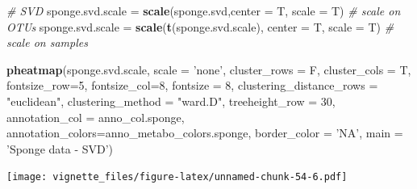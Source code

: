 \documentclass[]{book}
\newenvironment{Shaded}{\begin{snugshade}}{\end{snugshade}}
\newcommand{\KeywordTok}[1]{\textcolor[rgb]{0.13,0.29,0.53}{\textbf{#1}}}
\newcommand{\DataTypeTok}[1]{\textcolor[rgb]{0.13,0.29,0.53}{#1}}
\newcommand{\DecValTok}[1]{\textcolor[rgb]{0.00,0.00,0.81}{#1}}
\newcommand{\StringTok}[1]{\textcolor[rgb]{0.31,0.60,0.02}{#1}}
\newcommand{\CommentTok}[1]{\textcolor[rgb]{0.56,0.35,0.01}{\textit{#1}}}
\newcommand{\NormalTok}[1]{#1}
\begin{document}
\begin{Shaded}
\begin{Highlighting}[]
\CommentTok{# SVD}
\NormalTok{sponge.svd.scale =}\StringTok{ }\KeywordTok{scale}\NormalTok{(sponge.svd,}\DataTypeTok{center =}\NormalTok{ T, }\DataTypeTok{scale =}\NormalTok{ T) }\CommentTok{# scale on OTUs}
\NormalTok{sponge.svd.scale =}\StringTok{ }\KeywordTok{scale}\NormalTok{(}\KeywordTok{t}\NormalTok{(sponge.svd.scale), }\DataTypeTok{center =}\NormalTok{ T, }\DataTypeTok{scale =}\NormalTok{ T) }\CommentTok{# scale on samples}

\KeywordTok{pheatmap}\NormalTok{(sponge.svd.scale, }
         \DataTypeTok{scale =} \StringTok{'none'}\NormalTok{, }
         \DataTypeTok{cluster_rows =}\NormalTok{ F, }
         \DataTypeTok{cluster_cols =}\NormalTok{ T, }
         \DataTypeTok{fontsize_row=}\DecValTok{5}\NormalTok{, }\DataTypeTok{fontsize_col=}\DecValTok{8}\NormalTok{,}
         \DataTypeTok{fontsize =} \DecValTok{8}\NormalTok{,}
         \DataTypeTok{clustering_distance_rows =} \StringTok{"euclidean"}\NormalTok{,}
         \DataTypeTok{clustering_method =} \StringTok{"ward.D"}\NormalTok{,}
         \DataTypeTok{treeheight_row =} \DecValTok{30}\NormalTok{,}
         \DataTypeTok{annotation_col =}\NormalTok{ anno_col.sponge,}
         \DataTypeTok{annotation_colors=}\NormalTok{anno_metabo_colors.sponge,}
         \DataTypeTok{border_color =} \StringTok{'NA'}\NormalTok{,}
         \DataTypeTok{main =} \StringTok{'Sponge data - SVD'}\NormalTok{)}
\end{Highlighting}
\end{Shaded}

\texttt{[image: vignette\_files/figure-latex/unnamed-chunk-54-6.pdf]}
\end{document}
